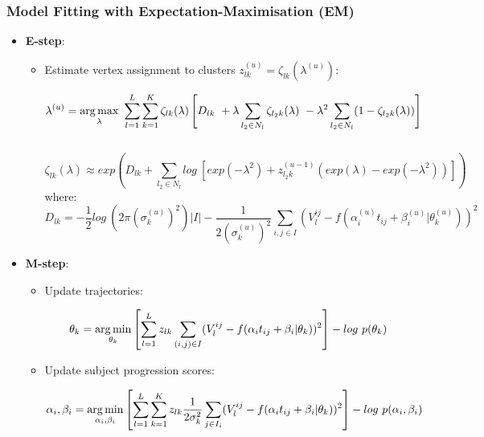 \begin{frame}[label=current]
\frametitle{Model Fitting with Expectation-Maximisation (EM)}


    \vspace{-4em}
    \begin{itemize}
    \item \textbf{E-step}:
    \begin{itemize}
    \item Estimate vertex assignment to clusters $z_{lk}^{(u)} = \zeta_{lk}(\lambda^{(u)})$:
     
    $$ \lambda^{(u)} = \argmax_{\lambda}\ \sum_{l=1}^L \sum_{k=1}^K \zeta_{lk}(\lambda) \left[  D_{lk} \  + \lambda \sum_{l_2 \in N_l}  \zeta_{l_2 k}(\lambda)\  -\lambda^2 \sum_{l_2 \in N_l} (1- \zeta_{l_2 k}(\lambda))  \right]$$\\
    $$    \zeta_{lk}(\lambda) \approx exp \left( D_{lk} +   \sum_{l_2 \in N_l} log\ \left[ exp(-\lambda^2) + z_{l_2k}^{(u-1)} (exp(\lambda) - exp(-\lambda^2)) \right] \right) $$
    where:
    $$ D_{lk} = -\frac{1}{2}log\ (2 \pi \left(\sigma_k^{(u)}\right)^2) |I| - \frac{1}{2\left(\sigma_k^{(u)}\right)^2} \sum_{i,j \in I} (V_l^{ij} - f(\alpha_i^{(u)} t_{ij} + \beta_i^{(u)} | \theta_k^{(u)}))^2$$
        
    \end{itemize}
    \item \textbf{M-step}:
    \begin{itemize}
     \item Update trajectories:
     
     \begin{equation}
 \label{eq:theta}
 \theta_k = \argmin_{\theta_k} \left[\sum_{l=1}^L z_{lk} \sum_{(i,j) \in I} (V_l^{ij} - f(\alpha_i t_{ij} + \beta_i | \theta_k))^2 \right] - log\ p(\theta_k) 
\end{equation}
     
     \item Update subject progression scores:
     
     \begin{equation}
\label{eq:alpha}
 \alpha_i, \beta_i = \operatorname*{arg\,min}_{\alpha_i, \beta_i}  \left[ \sum_{l=1}^L \sum_{k=1}^K z_{lk} \frac{1}{2\sigma_k^2} \sum_{j \in I_i} (V_l^{ij} - f(\alpha_i t_{ij} + \beta_i | \theta_k))^2\right] - log\ p(\alpha_i, \beta_i)
\end{equation}
     
    \end{itemize}
    \end{itemize}
\vspace{-3em}
    
\end{frame}



